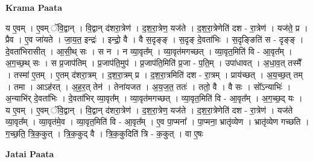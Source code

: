 \documentclass[17pt]{extarticle}
\begin{document}
\textbf{Krama Paata} \newline

य ए॒वम् । ए॒वम् ॅवि॒द्वान् । वि॒द्वान् द॑शरा॒त्रेण॑ । द॒श॒रा॒त्रेण॒ यज॑ते । द॒श॒रा॒त्रेणेति॑ दश - रा॒त्रेण॑ । यज॑ते॒ प्र । प्रैव । ए॒व जा॑यते । जा॒य॒त॒ इन्द्रः॑ । इन्द्रो॒ वै । वै स॒दृङ्‍ङ् । स॒दृङ् दे॒वता॑भिः । स॒दृङ्ङिति॑  स - दृङ्ङ् । दे॒वता॑भिरासीत् । आ॒सी॒थ् सः । स न । न व्या॒वृत᳚म् । व्या॒वृत॑मगच्छत् । व्या॒वृत॒मिति॑ वि - आ॒वृत᳚म् । अ॒ग॒च्छ॒थ् सः । स प्र॒जाप॑तिम् । प्र॒जाप॑ति॒मुप॑ । प्र॒जाप॑ति॒मिति॑ प्र॒जा - प॒ति॒म् । उपा॑धावत् । अ॒धा॒व॒त् तस्मै᳚ । तस्मा॑ ए॒तम् । ए॒तम् द॑शरा॒त्रम् । द॒श॒रा॒त्रम् प्र । द॒श॒रा॒त्रमिति॑ दश - रा॒त्रम् । प्राय॑च्छत् । अ॒य॒च्छ॒त् तम् । तमा । आऽह॑रत् । अ॒ह॒र॒त् तेन॑ । तेना॑यजत । अ॒य॒ज॒त॒ ततः॑ । ततो॒ वै । वै सः । सो᳚ऽन्याभिः॑ । अ॒न्याभि॑र् दे॒वता॑भिः । दे॒वता॑भिर् व्या॒वृत᳚म् । व्या॒वृत॑मगच्छत् । व्या॒वृत॒मिति॑ वि - आ॒वृत᳚म् । अ॒ग॒च्छ॒द् यः । य ए॒वम् । ए॒वम् ॅवि॒द्वान् । वि॒द्वान् द॑शरा॒त्रेण॑ । द॒श॒रा॒त्रेण॒ यज॑ते । द॒श॒रा॒त्रेणेति॑ दश - रा॒त्रेण॑ । यज॑ते व्या॒वृत᳚म् । व्या॒वृत॑मे॒व । व्या॒वृत॒मिति॑ वि - आ॒वृत᳚म् । ए॒व पा॒प्मना᳚ । पा॒प्मना॒ भ्रातृ॑व्येण । भ्रातृ॑व्येण गच्छति । ग॒च्छ॒ति॒ त्रि॒क॒कुत् । त्रि॒क॒कुद् वै । त्रि॒क॒कुदिति॑ त्रि - क॒कुत् । वा ए॒षः \newline

\textbf{Jatai Paata} \newline
\end{document}
